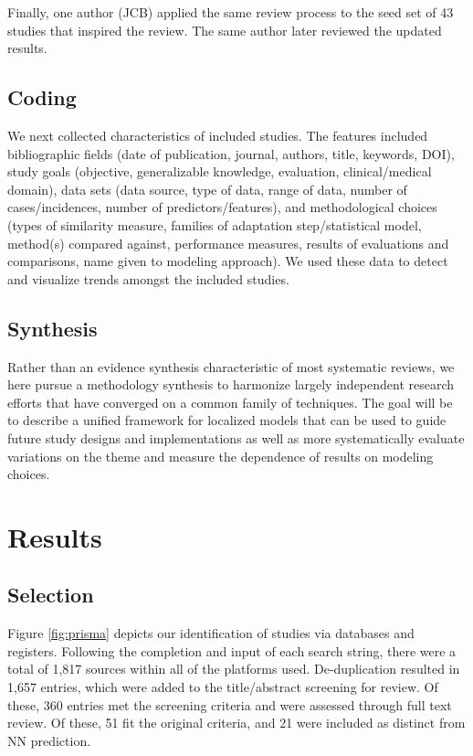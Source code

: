 \documentclass{article}
\begin{document}
Finally, one author (JCB) applied the same review process to the seed
set of 43 studies that inspired the review. The same author later
reviewed the updated results.

\hypertarget{coding}{%
\subsection{Coding}\label{coding}}

We next collected characteristics of included studies. The features
included bibliographic fields (date of publication, journal, authors,
title, keywords, DOI), study goals (objective, generalizable knowledge,
evaluation, clinical/medical domain), data sets (data source, type of
data, range of data, number of cases/incidences, number of
predictors/features), and methodological choices (types of similarity
measure, families of adaptation step/statistical model, method(s)
compared against, performance measures, results of evaluations and
comparisons, name given to modeling approach). We used these data to
detect and visualize trends amongst the included studies.

\hypertarget{synthesis}{%
\subsection{Synthesis}\label{synthesis}}

Rather than an evidence synthesis characteristic of most systematic
reviews, we here pursue a methodology synthesis to harmonize largely
independent research efforts that have converged on a common family of
techniques. The goal will be to describe a unified framework for
localized models that can be used to guide future study designs and
implementations as well as more systematically evaluate variations on
the theme and measure the dependence of results on modeling choices.

\hypertarget{results}{%
\section{Results}\label{results}}

\hypertarget{selection}{%
\subsection{Selection}\label{selection}}

Figure \ref{fig:prisma} depicts our identification of studies via
databases and registers. Following the completion and input of each
search string, there were a total of 1,817 sources within all of the
platforms used. De-duplication resulted in 1,657 entries, which were
added to the title/abstract screening for review. Of these, 360 entries
met the screening criteria and were assessed through full text review.
Of these, 51 fit the original criteria, and 21 were included as distinct
from NN prediction.
\end{document}

